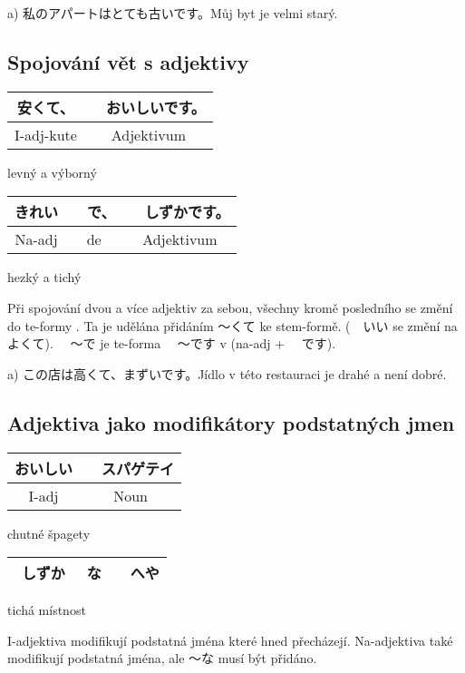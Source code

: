 a) 私のアパートはとても古いです。Můj byt je velmi starý.



\subsection{Spojování vět s adjektivy}
\begin{center}
\begin{tabular}{|c|c|}
\hline
安くて、&　おいしいです。\\
\hline
I-adj-kute&Adjektivum\\
\hline
\end{tabular}
\end{center}
levný a výborný


\begin{center}
\begin{tabular}{|c|c|c|}
\hline
きれい&　で、&　しずかです。\\
\hline
Na-adj & de&Adjektivum\\
\hline
\end{tabular}
\end{center}
hezký a tichý

Při spojování dvou a více adjektiv za sebou, všechny kromě posledního se změní do te-formy . Ta je udělána přidáním 〜くて ke stem-formě. (　いい se změní na　よくて). 　〜で je te-forma 　〜です v (na-adj + 　です).　


a) この店は高くて、まずいです。Jídlo v této restauraci je drahé a není dobré.

\subsection{Adjektiva jako modifikátory podstatných jmen}
\begin{center}
\begin{tabular}{|c|c|}
\hline
おいしい&　スパゲテイ\\
\hline
I-adj&Noun\\
\hline
\end{tabular}
\end{center}
chutné špagety


\begin{center}
\begin{tabular}{|c|c|c|}
\hline
しずか　&な&　へや\\
\hline
\end{tabular}
\end{center}
tichá místnost

I-adjektiva modifikují podstatná jména které hned přecházejí. Na-adjektiva také modifikují podstatná jména, ale 〜な musí být přidáno.


